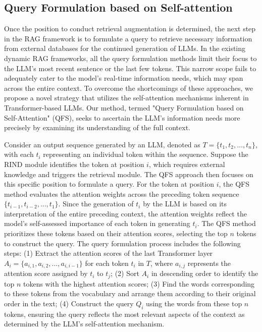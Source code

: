 \subsection{Query Formulation based on Self-attention}
\label{sec:QFS}

Once the position to conduct retrieval augmentation is determined, the next step in the RAG framework is to formulate a query to retrieve necessary information from external databases for the continued generation of LLMs.
In the existing dynamic RAG frameworks, all the query formulation methods limit their focus to the LLM's most recent sentence or the last few tokens. This narrow scope fails to adequately cater to the model's real-time information needs, which may span across the entire context. To overcome the shortcomings of these approaches, we propose a novel strategy that utilizes the self-attention mechanisms inherent in Transformer-based LLMs. Our method, termed "Query Formulation based on Self-Attention" (QFS), seeks to ascertain the LLM's information needs more precisely by examining its understanding of the full context.

Consider an output sequence generated by an LLM, denoted as \( T = \{t_1, t_2, \ldots, t_n\} \), with each \( t_i \) representing an individual token within the sequence. Suppose the RIND module identifies the token at position \( i \), which requires external knowledge and triggers the retrieval module. 
The QFS approach then focuses on this specific position to formulate a query. 
For the token at position \( i \), the QFS method evaluates the attention weights across the preceding token sequence \( \{t_{i-1}, t_{i-2}, ..., t_1\} \). 
Since the generation of \( t_i \) by the LLM is based on its interpretation of the entire preceding context, the attention weights reflect the model's self-assessed importance of each token in generating \( t_i \). 
The QFS method prioritizes these tokens based on their attention scores, selecting the top \( n \) tokens to construct the query. 
The query formulation process includes the following steps:
(1) Extract the attention scores of the last Transformer layer \( A_i = \{a_{i,1}, a_{i,2}, ..., a_{i,i-1}\} \) for each token \( t_i \) in \( T \), where \( a_{i,j} \) represents the attention score assigned by \( t_i \) to \( t_j \); 
(2) Sort \( A_i \) in descending order to identify the top \( n \) tokens with the highest attention scores;
(3) Find the words corresponding to these tokens from the vocabulary and arrange them according to their original order in the text;
(4) Construct the query \( Q_i \) using the words from these top \( n \) tokens, ensuring the query reflects the most relevant aspects of the context as determined by the LLM's self-attention mechanism.

